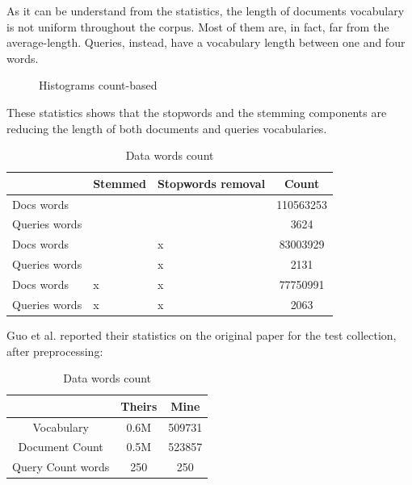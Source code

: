 As it can be understand from the statistics, the length of documents vocabulary is not uniform throughout the corpus. Most of them are, in fact, far from the average-length. Queries, instead, have a vocabulary length between one and four words. 

\begin{figure}[!tbp]
  \centering
  \hfill
  \caption{Histograms count-based}
  \label{fig:vocab_documents}
\end{figure}

These statistics shows that the stopwords and the stemming components are reducing the length of both documents and queries vocabularies.

\begin{table}[H]
\centering
\begin{tabular}{p{2cm}p{2cm}p{2cm}c}
 & Stemmed & Stopwords removal & Count \\ \hline
Docs words & & & 110563253 \\ \hline
Queries words & & & 3624 \\ \hline
Docs words & & x & 83003929 \\ \hline
Queries words & & x & 2131 \\ \hline
Docs words & x & x & 77750991 \\ \hline
Queries words & x & x & 2063 \\ \hline
\end{tabular}
\caption{Data words count}
\label{table:words count}
\end{table}

Guo et al. reported their statistics on the original paper for the test collection, after preprocessing:

\begin{table}[H]
\centering
\begin{tabular}{ccc}
 & Theirs & Mine \\ \hline
Vocabulary & 0.6M & 509731 \\
Document Count & 0.5M & 523857 \\
Query Count words & 250 & 250 \\ \hline
\end{tabular}
\caption{Data words count}
\label{table:words count}
\end{table}

